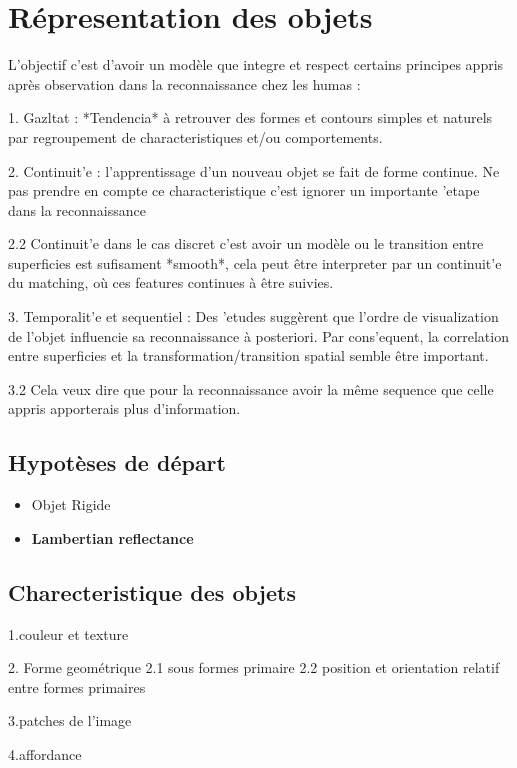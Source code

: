 \chapter{Répresentation des objets}

L'objectif c'est d'avoir un modèle que integre et respect certains principes appris après observation dans la reconnaissance chez les humas :

1. Gazltat :  *Tendencia* à retrouver des formes et contours simples et naturels par regroupement de characteristiques et/ou comportements.

2. Continuit'e : l'apprentissage d'un nouveau objet se fait de forme continue. Ne pas prendre en compte ce characteristique c'est ignorer un importante 'etape dans la reconnaissance

2.2 Continuit'e dans le cas discret c'est avoir un modèle ou le transition entre superficies est sufisament *smooth*, cela peut être interpreter par un continuit'e du matching, où ces features continues à être suivies.

3. Temporalit'e et sequentiel : Des 'etudes suggèrent que l'ordre de visualization de l'objet influencie sa reconnaissance à posteriori. Par cons'equent, la correlation entre superficies et la transformation/transition spatial semble être important. 

3.2 Cela veux dire que pour la reconnaissance avoir la même sequence que celle appris apporterais plus d'information.



\section {Hypotèses de départ}
\begin{itemize}
  \item Objet Rigide
  \item \textbf{Lambertian reflectance}
\end{itemize}

\section{Charecteristique des objets}

1.couleur et texture

2. Forme geométrique
2.1 sous formes primaire
2.2 position et orientation relatif entre formes primaires

3.patches de l'image

4.affordance

